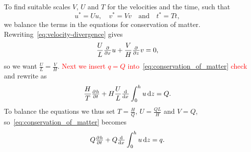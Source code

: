 To find suitable scales $V$, $U$ and $T$ for the velocities and the time, such that
%
\begin{equation*}
    u^* = Uu, \quad v^* = Vv \quad \text{and} \quad t^* = Tt,
\end{equation*}
%
we balance the terms in the equations for conservation of matter. Rewriting~\eqref{eq:velocity-divergence} gives
%
\begin{equation*}
     \frac{U}{L} \pd{}{x} u + \frac{V}{H} \pd{}{z} v = 0,
\end{equation*}
%
so we want $\frac{U}{L} = \frac{V}{H}$. \textcolor{red}{Next we insert $q = Q$ into~\eqref{eq:conservation_of_matter} check} and rewrite as
\begin{equation*}
    \frac{H}{T} \pd{h}{t} + H \frac{U}{L} \od{}{x} \int_0^h u \dif{z} = Q.
\end{equation*}
%
To balance the equations we thus set $T = \frac{H}{Q}$, $U = \frac{QL}{H}$ and $V = Q$, so~\eqref{eq:conservation_of_matter} becomes
%
\begin{equation}
    Q \pd{h}{t} + Q \od{}{x} \int_0^h u \dif{z} = q.
    \label{eq:conservation_of_matter_rescaled}
\end{equation}
